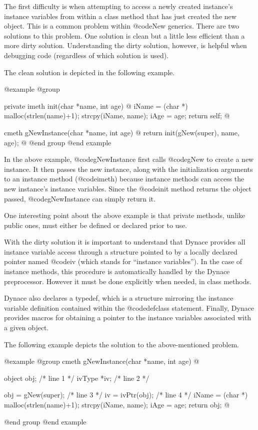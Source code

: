 The first difficulty is when attempting to access a newly created instance's
instance variables from within a class method that has just created the
new object.  This is a common problem within @code{New} generics.  There
are two solutions to this problem.  One solution is clean but a little
less efficient than a more dirty solution.  Understanding the dirty
solution, however, is helpful when debugging code (regardless of which
solution is used).

The clean solution is depicted in the following example.

@example
@group

private imeth  init(char *name, int age)
@{
        iName = (char *) malloc(strlen(name)+1);
        strcpy(iName, name);
        iAge = age;
        return self;
@}

cmeth   gNewInstance(char *name, int age)
@{
        return init(gNew(super), name, age);
@}
@end group
@end example

In the above example, @code{gNewInstance} first calls @code{gNew} to
create a new instance.  It then passes the new instance, along with the
initialization arguments to an instance method (@code{imeth}) because
instance methods can access the new instance's instance variables.
Since the @code{init} method returns the object passed, @code{gNewInstance}
can simply return it.

One interesting point about the above example is that private methods,
unlike public ones, must either be defined or declared prior to use.

With the dirty solution it is important to understand that Dynace
provides all instance variable access through a structure pointed to
by a locally declared pointer named @code{iv} (which stands for
``instance variables'').  In the case of instance methods, this
procedure is automatically handled by the Dynace preprocessor.
However it must be done explicitly when needed, in class methods.

Dynace also declares a typedef, which is a structure mirroring the
instance variable definition contained within the @code{defclass}
statement.  Finally, Dynace provides macros for obtaining
a pointer to the instance variables associated with a given object.

The following example depicts the solution to the above-mentioned problem.

@example
@group
cmeth   gNewInstance(char *name, int age)
@{
        object  obj;                    /*  line 1  */
        ivType  *iv;                    /*  line 2  */

        obj = gNew(super);              /*  line 3  */
        iv = ivPtr(obj);                /*  line 4  */
        iName = (char *) malloc(strlen(name)+1);
        strcpy(iName, name);
        iAge = age;
        return obj;
@}
@end group
@end example


